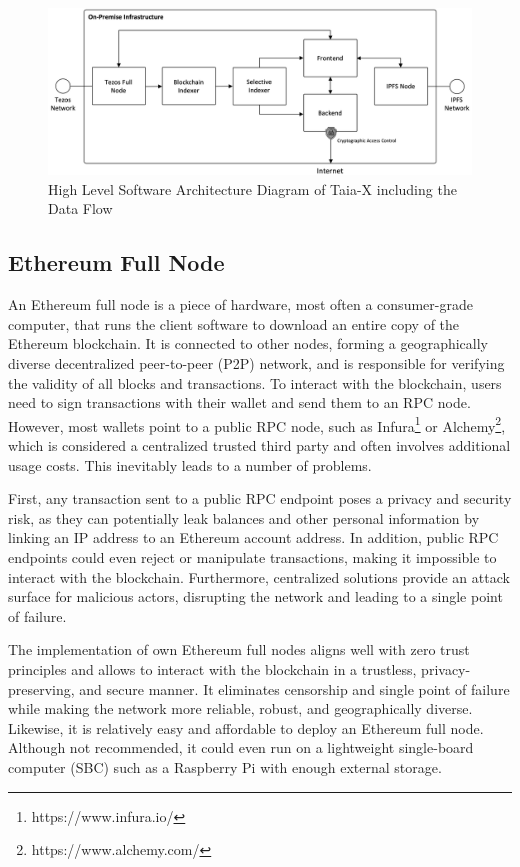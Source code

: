 \begin{figure}[!htb]
    \centering
    \includegraphics[width=14cm]{images/arch.png}
    \caption[High Level Software Architecture Diagram of Taia-X]{High Level Software Architecture Diagram of Taia-X including the Data Flow}
    \label{fig:arch}
\end{figure}

\subsection{Ethereum Full Node}

An Ethereum full node is a piece of hardware, most often a consumer-grade computer, that runs the client software to download an entire copy of the Ethereum blockchain. It is connected to other nodes, forming a geographically diverse decentralized peer-to-peer (P2P) network, and is responsible for verifying the validity of all blocks and transactions. To interact with the blockchain, users need to sign transactions with their wallet and send them to an RPC node. However, most wallets point to a public RPC node, such as Infura\footnote{https://www.infura.io/} or Alchemy\footnote{https://www.alchemy.com/}, which is considered a centralized trusted third party and often involves additional usage costs. This inevitably leads to a number of problems.

First, any transaction sent to a public RPC endpoint poses a privacy and security risk, as they can potentially leak balances and other personal information by linking an IP address to an Ethereum account address. In addition, public RPC endpoints could even reject or manipulate transactions, making it impossible to interact with the blockchain. Furthermore, centralized solutions provide an attack surface for malicious actors, disrupting the network and leading to a single point of failure.

The implementation of own Ethereum full nodes aligns well with zero trust principles and allows to interact with the blockchain in a trustless, privacy-preserving, and secure manner. It eliminates censorship and single point of failure while making the network more reliable, robust, and geographically diverse. Likewise, it is relatively easy and affordable to deploy an Ethereum full node. Although not recommended, it could even run on a lightweight single-board computer (SBC) such as a Raspberry Pi with enough external storage.

